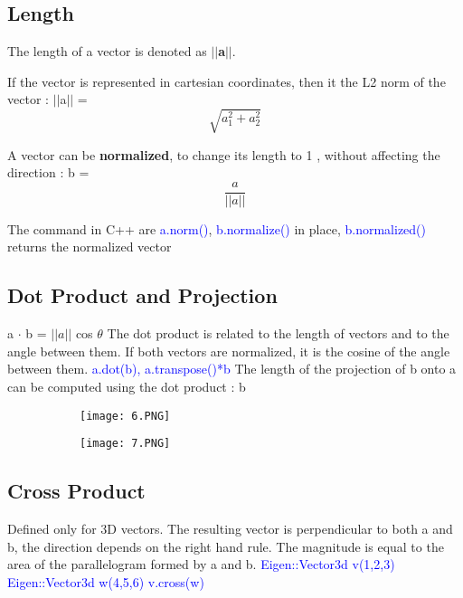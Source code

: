 \documentclass{article}
\begin{document}
\subsection{Length}
The length of a vector is denoted as \textbf{$||$a$||$}.

If the vector is represented in cartesian coordinates, then it the L2 norm of the vector : $||$a$||$ = \[ \sqrt{a^2_1 + a^2_2} \]

A vector can be  \textbf{normalized}, to change its length to 1 , without affecting the direction : b = \[\frac{a}{||a||}\]


The command in C++ are \textcolor{blue}{a.norm()}, \textcolor{blue}{b.normalize()} in place, \textcolor{blue}{b.normalized()} returns the normalized vector

\subsection{Dot Product and Projection}

a $\cdot$ b = $||a||$ cos $\theta$ 
The dot product is related to the length of vectors and to the angle between them. If both vectors are normalized, it is the cosine of the angle between them. \textcolor{blue}{a.dot(b), a.transpose()*b}
The length of the projection of b onto a can be computed using the dot product : b 

\begin{figure}[ht!]
  \centering
  \begin{subfigure}[b]{0.2\linewidth}
    \texttt{[image: 6.PNG]}
  \end{subfigure}
  \begin{subfigure}[b]{0.2\textwidth}
         \centering
         \texttt{[image: 7.PNG]}
     \end{subfigure}
\end{figure}

\subsection{Cross Product}

Defined only for 3D vectors.
The resulting vector is perpendicular to both a and b, the direction depends on the right hand rule. The magnitude is equal to the area of the parallelogram formed by a and b. 
\textcolor{blue}{Eigen::Vector3d v(1,2,3) Eigen::Vector3d w(4,5,6) v.cross(w)}
\end{document}
